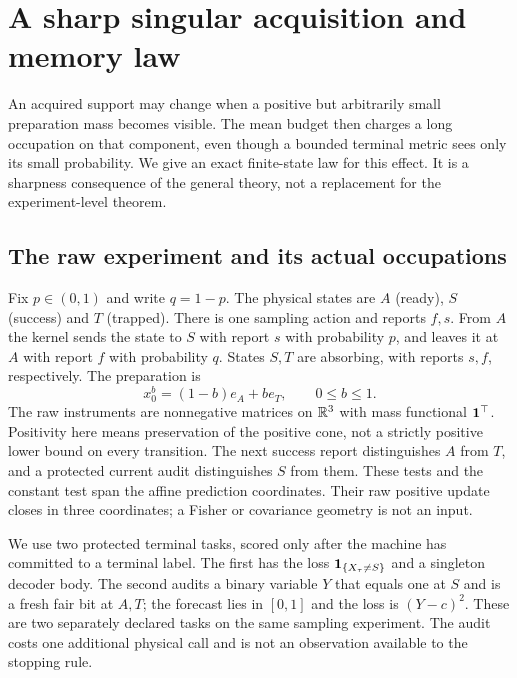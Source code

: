 \section{A sharp singular acquisition and memory law}\label{sec:singular-memory}
An acquired support may change when a positive but arbitrarily small preparation mass becomes visible. The mean budget then charges a long occupation on that component, even though a bounded terminal metric sees only its small probability. We give an exact finite-state law for this effect. It is a sharpness consequence of the general theory, not a replacement for the experiment-level theorem.

\subsection{The raw experiment and its actual occupations}
Fix $p\in(0,1)$ and write $q=1-p$. The physical states are $A$ (ready), $S$ (success) and $T$ (trapped). There is one sampling action and reports $f,s$. From $A$ the kernel sends the state to $S$ with report $s$ with probability $p$, and leaves it at $A$ with report $f$ with probability $q$. States $S,T$ are absorbing, with reports $s,f$, respectively. The preparation is
\begin{equation}\label{eq:rare-preparation}
 x_0^b=(1-b)e_A+be_T,\qquad 0\le b\le1.
\end{equation}
The raw instruments are nonnegative matrices on $\mathbb R^3$ with mass functional $\mathbf 1^\top$. Positivity here means preservation of the positive cone, not a strictly positive lower bound on every transition. The next success report distinguishes $A$ from $T$, and a protected current audit distinguishes $S$ from them. These tests and the constant test span the affine prediction coordinates. Their raw positive update closes in three coordinates; a Fisher or covariance geometry is not an input.

We use two protected terminal tasks, scored only after the machine has committed to a terminal label. The first has the loss $\mathbf 1_{\{X_\tau\ne S\}}$ and a singleton decoder body. The second audits a binary variable $Y$ that equals one at $S$ and is a fresh fair bit at $A,T$; the forecast lies in $[0,1]$ and the loss is $(Y-c)^2$. These are two separately declared tasks on the same sampling experiment. The audit costs one additional physical call and is not an observation available to the stopping rule.

